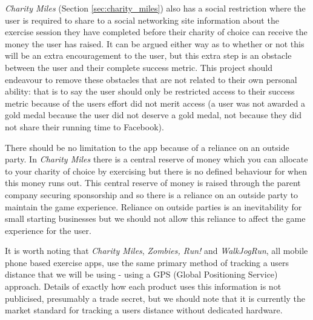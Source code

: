 \emph{Charity Miles} (Section \ref{sec:charity_miles}) also has a social
restriction where the user is required to share to a social networking
site information about the exercise session they have completed before
their charity of choice can receive the money the user has raised. It
can be argued either way as to whether or not this will be an extra
encouragement to the user, but this extra step is an obstacle
between the user and their complete success metric. This project
should endeavour to remove these obstacles that are not related to
their own personal ability: that is to say the user should only be
restricted access to their success metric because of the users effort
did not merit access (a user was not awarded a gold medal because the
user did not deserve a gold medal, not because they did not share
their running time to Facebook).

There should be no limitation to the app because of a reliance on an
outside party. In \emph{Charity Miles} there is a central reserve of
money which you can allocate to your charity of choice by exercising
but there is no defined behaviour for when this money runs out. This
central reserve of money is raised through the parent company securing
sponsorship and so there is a reliance on an outside party to maintain
the game experience. Reliance on outside parties is an inevitability
for small starting businesses but we should not allow this reliance to
affect the game experience for the user.

It is worth noting that \emph{Charity Miles}, \emph{Zombies, Run!} and
\emph{WalkJogRun}, all mobile phone based exercise apps, use the same
primary method of tracking a users distance that we will be using -
using a GPS (Global Positioning Service) approach. Details of exactly
how each product uses this information is not publicised, presumably a
trade secret, but we should note that it is currently the market
standard for tracking a users distance without dedicated hardware. 
